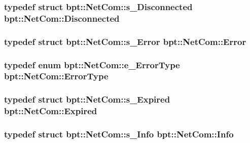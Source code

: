 \hypertarget{namespacebpt_1_1_net_com_a9c3ba50108780e0eb42c6e684de8e39e}{
\subsubsection[{Disconnected}]{\setlength{\rightskip}{0pt plus 5cm}typedef struct {\bf bpt\-::\-Net\-Com\-::s\-\_\-\-Disconnected}			 {\bf bpt\-::\-Net\-Com\-::\-Disconnected}}}\label{namespacebpt_1_1_net_com_a9c3ba50108780e0eb42c6e684de8e39e}
\hypertarget{namespacebpt_1_1_net_com_ae61d63e0ecc44c7b3a5a9a71df6a3e60}{
\subsubsection[{Error}]{\setlength{\rightskip}{0pt plus 5cm}typedef struct {\bf bpt\-::\-Net\-Com\-::s\-\_\-\-Error}			 {\bf bpt\-::\-Net\-Com\-::\-Error}}}\label{namespacebpt_1_1_net_com_ae61d63e0ecc44c7b3a5a9a71df6a3e60}
\hypertarget{namespacebpt_1_1_net_com_a401866ee6997493e98c7823af2d1bca6}{
\subsubsection[{Error\-Type}]{\setlength{\rightskip}{0pt plus 5cm}typedef enum {\bf bpt\-::\-Net\-Com\-::e\-\_\-\-Error\-Type}			 {\bf bpt\-::\-Net\-Com\-::\-Error\-Type}}}\label{namespacebpt_1_1_net_com_a401866ee6997493e98c7823af2d1bca6}
\hypertarget{namespacebpt_1_1_net_com_a71deac9d5c07a72565490311030b44fe}{
\subsubsection[{Expired}]{\setlength{\rightskip}{0pt plus 5cm}typedef struct {\bf bpt\-::\-Net\-Com\-::s\-\_\-\-Expired}			 {\bf bpt\-::\-Net\-Com\-::\-Expired}}}\label{namespacebpt_1_1_net_com_a71deac9d5c07a72565490311030b44fe}
\hypertarget{namespacebpt_1_1_net_com_ad2f0a143a2bfc9b23ad2c84f418ee103}{
\subsubsection[{Info}]{\setlength{\rightskip}{0pt plus 5cm}typedef struct {\bf bpt\-::\-Net\-Com\-::s\-\_\-\-Info}			 {\bf bpt\-::\-Net\-Com\-::\-Info}}}\label{namespacebpt_1_1_net_com_ad2f0a143a2bfc9b23ad2c84f418ee103}
